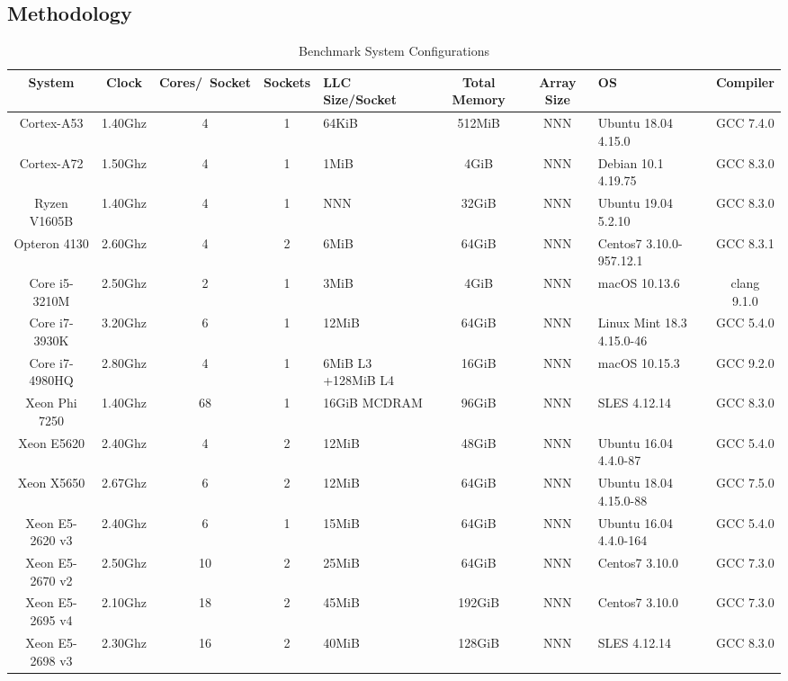 
\subsection{Methodology}
\label{subsec:methodology}

\begin{table}
\caption{Benchmark System Configurations}
\label{tab:benchsys}
\begin{tabular}{ccccp{15mm}ccp{16mm}c}
\toprule
System&Clock&Cores/\newline~Socket&Sockets&LLC Size/Socket&Total Memory&Array Size&OS&Compiler\\
\midrule
Cortex-A53      & 1.40Ghz & 4  & 1 & 64KiB  & 512MiB & NNN & Ubuntu 18.04 4.15.0 & GCC 7.4.0\\
Cortex-A72      & 1.50Ghz & 4  & 1 & 1MiB   & 4GiB & NNN & Debian 10.1 4.19.75 & GCC 8.3.0\\
Ryzen V1605B    & 1.40Ghz & 4  & 1 & NNN    & 32GiB & NNN & Ubuntu 19.04 5.2.10&GCC 8.3.0\\
Opteron 4130    & 2.60Ghz & 4  & 2 & 6MiB   & 64GiB & NNN & Centos7 3.10.0-957.12.1&GCC 8.3.1\\
Core i5-3210M   & 2.50Ghz & 2  & 1 & 3MiB   & 4GiB & NNN & macOS 10.13.6&clang 9.1.0\\
Core i7-3930K   & 3.20Ghz & 6  & 1 & 12MiB  & 64GiB & NNN & Linux Mint 18.3 4.15.0-46&GCC 5.4.0\\
Core i7-4980HQ  & 2.80Ghz & 4  & 1 & 6MiB L3 +\newline 128MiB L4 & 16GiB & NNN & macOS 10.15.3&GCC 9.2.0\\
Xeon Phi 7250   & 1.40Ghz & 68 & 1 & 16GiB \newline MCDRAM & 96GiB & NNN & SLES 4.12.14&GCC 8.3.0\\
Xeon E5620      & 2.40Ghz & 4  & 2 & 12MiB & 48GiB & NNN & Ubuntu 16.04 4.4.0-87&GCC 5.4.0\\
Xeon X5650      & 2.67Ghz & 6  & 2 & 12MiB & 64GiB & NNN & Ubuntu 18.04 4.15.0-88&GCC 7.5.0\\
Xeon E5-2620 v3 & 2.40Ghz & 6  & 1 & 15MiB & 64GiB & NNN & Ubuntu 16.04 4.4.0-164&GCC 5.4.0\\
Xeon E5-2670 v2 & 2.50Ghz & 10 & 2 & 25MiB & 64GiB & NNN & Centos7 3.10.0&GCC 7.3.0\\
Xeon E5-2695 v4 & 2.10Ghz & 18 & 2 & 45MiB & 192GiB & NNN & Centos7 3.10.0&GCC 7.3.0\\
Xeon E5-2698 v3 & 2.30Ghz & 16 & 2 & 40MiB & 128GiB & NNN & SLES 4.12.14&GCC 8.3.0\\
\bottomrule
\end{tabular}
\end{table}


